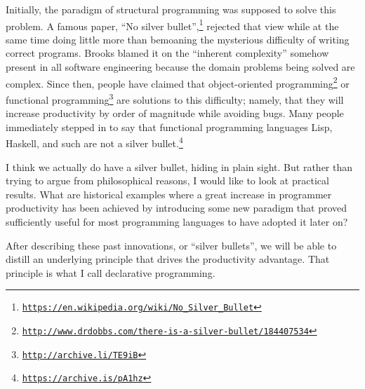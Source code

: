 Initially, the paradigm of structural programming was supposed to
solve this problem. A famous paper, \textsf{``}No silver bullet\textsf{''},\footnote{\texttt{\href{https://en.wikipedia.org/wiki/No_Silver_Bullet}{https://en.wikipedia.org/wiki/No\_Silver\_Bullet}}}
rejected that view while at the same time doing little more than bemoaning
the mysterious difficulty of writing correct programs. Brooks blamed
it on the \textsf{``}inherent complexity\textsf{''} somehow present in all software
engineering because the domain problems being solved are complex.
Since then, people have claimed that object-oriented programming\footnote{\texttt{\href{http://www.drdobbs.com/there-is-a-silver-bullet/184407534}{http://www.drdobbs.com/there-is-a-silver-bullet/184407534}}}
or functional programming\footnote{\texttt{\href{http://archive.li/TE9iB}{http://archive.li/TE9iB}}}
are solutions to this difficulty; namely, that they will increase
productivity by order of magnitude while avoiding bugs. Many people
immediately stepped in to say that functional programming languages
\textemdash{} Lisp, Haskell, and such \textemdash{} are not a silver
bullet.\footnote{\texttt{\href{https://www.slideshare.net/nashjain/no-silver-bullets-in-functional-programming-by-brian-mckenna}{https://archive.is/pA1hz}}}

I think we actually do have a silver bullet, hiding in plain sight.
But rather than trying to argue from philosophical reasons, I would
like to look at practical results. What are historical examples where
a great increase in programmer productivity has been achieved by introducing
some new paradigm that proved sufficiently useful for most programming
languages to have adopted it later on?

After describing these past innovations, or \textsf{``}silver bullets\textsf{''},
we will be able to distill an underlying principle that drives the
productivity advantage. That principle is what I call declarative
programming. 


